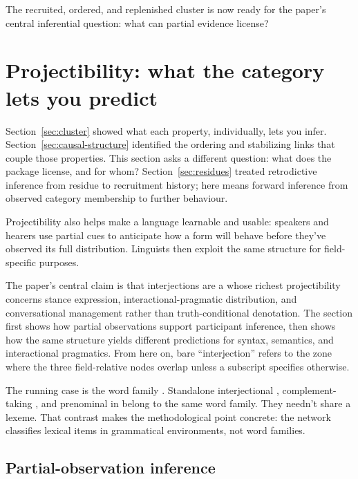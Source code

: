 \documentclass[12pt]{article}
\begin{document}
The recruited, ordered, and replenished cluster is now ready for the
paper's central inferential question: what can partial evidence license?

\section[Projectibility]{Projectibility: what the category lets you predict}\label{sec:projectibility}

Section~\ref{sec:cluster} showed what each property, individually, lets
you infer. Section~\ref{sec:causal-structure} identified the ordering
and stabilizing links that couple those properties. This section asks a
different question: what does the package license, and for whom?
Section~\ref{sec:residues}
treated retrodictive inference from residue to recruitment history; here
 means forward inference from observed category
membership to further behaviour.

Projectibility also helps make a language learnable and usable:
speakers and hearers use partial cues to anticipate how a form will
behave before they've observed its full distribution. Linguists then
exploit the same structure for field-specific purposes.

The paper's central claim is that interjections are a
 whose richest
projectibility concerns stance expression, interactional-pragmatic
distribution, and conversational management rather than
truth-conditional denotation. The section first shows how partial
observations support participant inference, then shows how the same
structure yields different predictions for syntax, semantics, and
interactional pragmatics. From here on, bare \enquote{interjection}
refers to the zone where the three field-relative nodes overlap unless a
subscript specifies otherwise.

The running case is the word family . Standalone
interjectional , complement-taking , and prenominal  in 
belong to the same word family. They needn't share a lexeme.
That contrast makes the methodological point concrete: the network
classifies lexical items in grammatical environments, not word families.

\subsection{Partial-observation inference}\label{sec:proj-partial}
\end{document}
